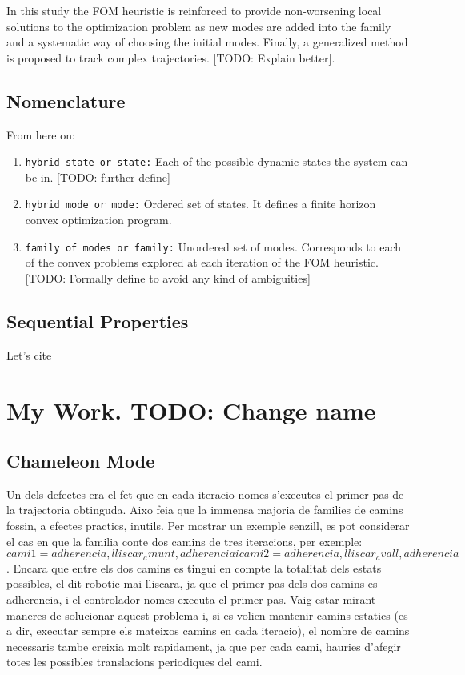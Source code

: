 \documentclass[12,twoside]{TFG-GM}
\theoremstyle{definition}
\theoremstyle{remark}
\begin{document}
In this study the FOM heuristic is reinforced to provide non-worsening local solutions to the optimization problem as new modes are added into the family and a systematic way of choosing the initial modes. Finally, a generalized method is proposed to track complex trajectories. [TODO: Explain better].



\subsection{Nomenclature}
\label{subsec:nomenclature}
From here on:
\begin{enumerate}[\bf (1)]
\item{\tt hybrid state or state:} Each of the possible dynamic states the system can be in. [TODO: further define]
\item{\tt hybrid mode or mode:} Ordered set of states. It defines a finite horizon convex optimization program.
\item{\tt family of modes or family:} Unordered set of modes. Corresponds to each of the convex problems explored at each iteration of the FOM heuristic.
[TODO: Formally define to avoid any kind of ambiguities]
\end{enumerate}

\subsection{Sequential Properties}
\label{subsec:sequential}
Let's cite \cite{seq}


\section{My Work. TODO: Change name}
\label{sec:work}

\subsection{Chameleon Mode}
\label{subsec:karmachameleon}
Un dels defectes era el fet que en cada iteracio nomes s'executes el primer pas de la trajectoria obtinguda. Aixo feia que la immensa majoria de families de camins fossin, a efectes practics, inutils. Per mostrar un exemple senzill, es pot considerar el cas en que la familia conte dos camins de tres iteracions, per exemple:
$$cami1 = {adherencia, lliscar_amunt, adherencia} i cami2 = {adherencia, lliscar_avall, adherencia}$$. Encara que entre els dos camins es tingui en compte la totalitat dels estats possibles, el dit robotic mai lliscara, ja que el primer pas dels dos camins es adherencia, i el controlador nomes executa el primer pas. Vaig estar mirant maneres de solucionar aquest problema i, si es volien mantenir camins estatics (es a dir, executar sempre els mateixos camins en cada iteracio), el nombre de camins necessaris tambe creixia molt rapidament, ja que per cada cami, hauries d'afegir totes les possibles translacions periodiques del cami.
\end{document}
